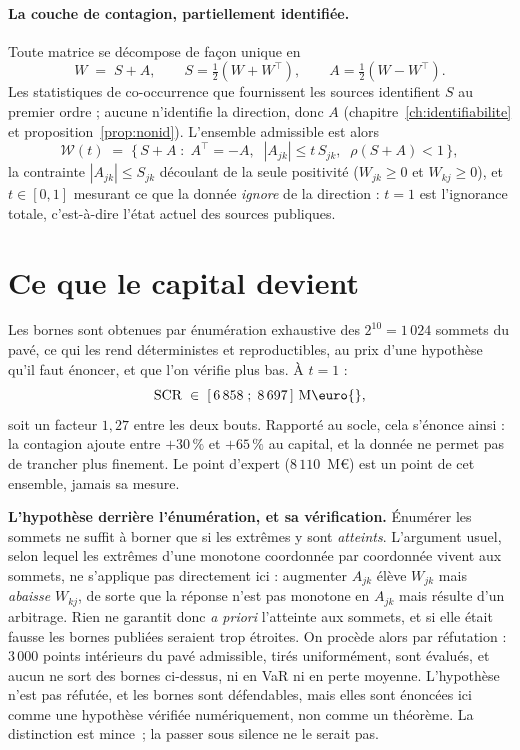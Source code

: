 \paragraph{La couche de contagion, partiellement identifiée.} Toute matrice se décompose
de façon unique en
\[
  W \;=\; S + A, \qquad S = \tfrac{1}{2}(W + W^{\top}), \qquad A = \tfrac{1}{2}(W - W^{\top}) .
\]
Les statistiques de co-occurrence que fournissent les sources identifient $S$ au premier ordre ;
aucune n'identifie la direction, donc $A$ (chapitre~\ref{ch:identifiabilite} et
proposition~\ref{prop:nonid}). L'ensemble admissible est alors
\[
  \mathcal{W}(t) \;=\; \bigl\{\, S + A \;:\; A^{\top} = -A, \;\; |A_{jk}| \leq t\,S_{jk},
  \;\; \rho(S+A) < 1 \,\bigr\},
\]
la contrainte $|A_{jk}| \leq S_{jk}$ découlant de la seule positivité ($W_{jk}\geq 0$ et
$W_{kj}\geq 0$), et $t\in[0,1]$ mesurant ce que la donnée \emph{ignore} de la direction :
$t=1$ est l'ignorance totale, c'est-à-dire l'état actuel des sources publiques.


\section{Ce que le capital devient}

Les bornes sont obtenues par énumération exhaustive des $2^{10} = 1\,024$ sommets
du pavé, ce qui les rend déterministes et reproductibles, au prix d'une hypothèse qu'il faut
énoncer, et que l'on vérifie plus bas. À $t=1$ :
\[
  \mathrm{SCR} \;\in\; [\,6\,858 \;;\; 8\,697\,]~\text{M\euro{}} ,
\]
soit un facteur $1{,}27$ entre les deux bouts. Rapporté au socle, cela s'énonce ainsi :
la contagion ajoute entre $+30\,\%$ et $+65\,\%$ au capital, et la donnée ne
permet pas de trancher plus finement. Le point d'expert ($8\,110$~M\euro{}) est un point
de cet ensemble, jamais sa mesure.

\begin{attention}
\textbf{L'hypothèse derrière l'énumération, et sa vérification.} Énumérer les sommets ne suffit
à borner que si les extrêmes y sont \emph{atteints}. L'argument usuel, selon lequel les extrêmes d'une monotone coordonnée par coordonnée vivent aux sommets, ne s'applique pas
directement ici : augmenter $A_{jk}$ élève $W_{jk}$ mais \emph{abaisse} $W_{kj}$, de sorte que
la réponse n'est pas monotone en $A_{jk}$ mais résulte d'un arbitrage. Rien ne garantit donc
\emph{a priori} l'atteinte aux sommets, et si elle était fausse les bornes publiées seraient trop
étroites. On procède alors par réfutation : $3\,000$ points intérieurs du pavé
admissible, tirés uniformément, sont évalués, et aucun ne sort des bornes ci-dessus, ni
en VaR ni en perte moyenne. L'hypothèse n'est pas réfutée, et les bornes sont défendables, mais
elles sont énoncées ici comme une hypothèse vérifiée numériquement, non comme un
théorème. La distinction est mince~; la passer sous silence ne le serait pas.
\end{attention}

